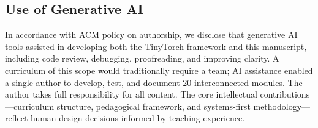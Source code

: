 \documentclass[10pt,twocolumn]{article}
\begin{document}
\subsection*{Use of Generative AI}

In accordance with ACM policy on authorship, we disclose that generative AI tools assisted in developing both the TinyTorch framework and this manuscript, including code review, debugging, proofreading, and improving clarity. A curriculum of this scope would traditionally require a team; AI assistance enabled a single author to develop, test, and document 20 interconnected modules. The author takes full responsibility for all content. The core intellectual contributions---curriculum structure, pedagogical framework, and systems-first methodology---reflect human design decisions informed by teaching experience.


\end{document}
